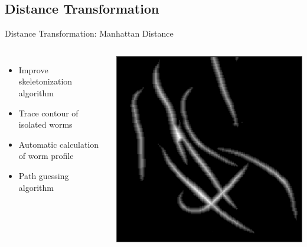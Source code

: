 \documentclass[xcolor=table]{beamer}
\begin{document}

\subsection{Distance Transformation}
\begin{frame}{Distance Transformation: Manhattan Distance}

\begin{columns}[c]
\column{2.4in}
\begin{itemize}
\item Improve skeletonization algorithm \pause
\item Trace contour of isolated worms \pause
\item Automatic calculation of worm profile \pause
\item Path guessing algorithm
\end{itemize}
\column{2in}
\includegraphics[scale=0.27]{results/test1/dt-shape1}

\end{columns}

\end{frame}


\end{document}

